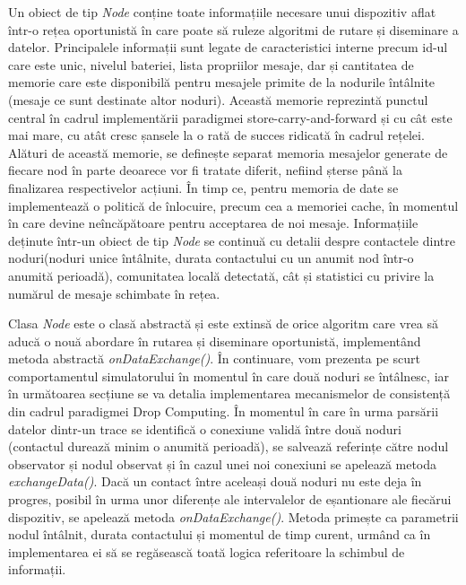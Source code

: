 \documentclass[12pt,a4paper]{report}
\begin{document}
Un obiect de tip \textit{Node} conține toate informațiile necesare unui dispozitiv aflat într-o rețea oportunistă în care poate să ruleze algoritmi de rutare și diseminare a datelor. Principalele informații sunt legate de caracteristici interne precum id-ul care este unic, nivelul bateriei, lista propriilor mesaje, dar și cantitatea de memorie care este disponibilă pentru mesajele primite de la nodurile întâlnite (mesaje ce sunt destinate altor noduri). Această memorie reprezintă punctul central în cadrul implementării paradigmei store-carry-and-forward și cu cât este mai mare, cu atât cresc șansele la o rată de succes ridicată în cadrul rețelei. Alături de această memorie, se definește separat memoria mesajelor generate de fiecare nod în parte deoarece vor fi tratate diferit, nefiind șterse până la finalizarea respectivelor acțiuni. În timp ce, pentru memoria de date se implementează o politică de înlocuire, precum cea a memoriei cache, în momentul în care devine neîncăpătoare pentru acceptarea de noi mesaje. 
Informațiile deținute într-un obiect de tip \textit{Node} se continuă cu detalii despre contactele dintre noduri(noduri unice întâlnite, durata contactului cu un anumit nod într-o anumită perioadă), comunitatea locală detectată, cât și statistici cu privire la numărul de mesaje schimbate în rețea. 

Clasa \textit{Node} este o clasă abstractă și este extinsă de orice algoritm care vrea să aducă o nouă abordare în rutarea și diseminare oportunistă, implementând metoda abstractă \textit{onDataExchange()}. În continuare, vom prezenta pe scurt comportamentul simulatorului în momentul în care două noduri se întâlnesc, iar în următoarea secțiune se va detalia implementarea mecanismelor de consistență din cadrul paradigmei Drop Computing\cite{DC}. În momentul în care în urma parsării datelor dintr-un trace se identifică o conexiune validă între două noduri (contactul durează minim o anumită perioadă), se salvează referințe către nodul observator și nodul observat și în cazul unei noi conexiuni se apelează metoda \textit{exchangeData()}. Dacă un contact între aceleași două noduri nu este deja în progres, posibil în urma unor diferențe ale intervalelor de eșantionare ale fiecărui dispozitiv, se apelează metoda \textit{onDataExchange()}. Metoda primește ca parametrii nodul întâlnit, durata contactului și momentul de timp curent, urmând ca în implementarea ei să se regăsească toată logica referitoare la schimbul de informații. 
\end{document}
